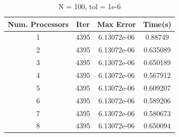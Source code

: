 \documentclass{amsart} %
\begin{document}
\begin{table}[ht]
	\caption{N = 100, tol = 1e-6} %
	\centering %
	\begin{tabular}{c c c c} %
		\hline\hline %
		Num. Processors & Iter & Max Error & Time(s) \\ [0.5ex] %
		\hline %
		1 & 4395 & 6.13072e-06 & 0.88749 \\ %
		2 & 4395 & 6.13072e-06 & 0.635089 \\
		3 & 4395 & 6.13072e-06 & 0.650189 \\
		4 & 4395 & 6.13072e-06 & 0.567912 \\
		5 & 4395 & 6.13072e-06 & 0.609207 \\ 
		6 & 4395 & 6.13072e-06 & 0.589206 \\
		7 & 4395 & 6.13072e-06 & 0.580673 \\
		8 & 4395 & 6.13072e-06 & 0.650094 \\[1ex] %
		\hline %
	\end{tabular}
	\label{table:nonlin} %
\end{table}




\end{document}
